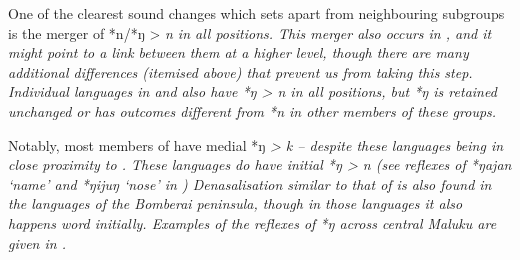 One of the clearest sound changes which sets 
apart from neighbouring subgroups is the merger of *n/*ŋ > \it{n} in all positions.
This merger also occurs in ,
and it might point to a link between them at a higher level,
though there are many additional differences (itemised above)
that prevent us from taking this step.
Individual languages in 
and  also have *ŋ > \it{n} in all
positions, but *ŋ is retained unchanged or has outcomes different from *n
in other members of these groups.

Notably, most members of  have medial *ŋ \it{>
k} -- despite these languages being in close proximity to .
These languages do have initial *ŋ > \it{n} (see reflexes of
*ŋajan ‘name’ and *ŋijuŋ ‘nose’ in ) Denasalisation similar to that
of  is also found in the languages of the Bomberai
peninsula, though in those languages it also happens word initially.
Examples of the reflexes of *ŋ across central Maluku are given in .

